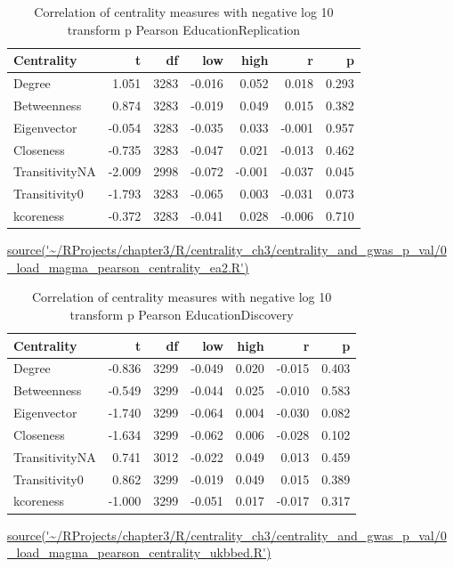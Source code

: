 \begin{table}[ht]
\centering
\begin{tabular}{lrrrrrr}
  \toprule
Centrality & t & df & low & high & r & p \\ 
  \midrule
Degree & 1.051 & 3283 & -0.016 & 0.052 & 0.018 & 0.293 \\ 
  Betweenness & 0.874 & 3283 & -0.019 & 0.049 & 0.015 & 0.382 \\ 
  Eigenvector & -0.054 & 3283 & -0.035 & 0.033 & -0.001 & 0.957 \\ 
  Closeness & -0.735 & 3283 & -0.047 & 0.021 & -0.013 & 0.462 \\ 
  TransitivityNA & -2.009 & 2998 & -0.072 & -0.001 & -0.037 & 0.045 \\ 
  Transitivity0 & -1.793 & 3283 & -0.065 & 0.003 & -0.031 & 0.073 \\ 
  kcoreness & -0.372 & 3283 & -0.041 & 0.028 & -0.006 & 0.710 \\ 
   \bottomrule
\end{tabular}
\caption{Correlation of centrality measures with negative log 10 transform p Pearson EducationReplication} 
\tiny\url{source('~/RProjects/chapter3/R/centrality_ch3/centrality_and_gwas_p_val/0_load_magma_pearson_centrality_ea2.R')}
\label{tab:Correlation of centrality measures with negative log 10 transform p Pearson EducationReplication}
\end{table}



\begin{table}[ht]
\centering
\begin{tabular}{lrrrrrr}
  \toprule
Centrality & t & df & low & high & r & p \\ 
  \midrule
Degree & -0.836 & 3299 & -0.049 & 0.020 & -0.015 & 0.403 \\ 
  Betweenness & -0.549 & 3299 & -0.044 & 0.025 & -0.010 & 0.583 \\ 
  Eigenvector & -1.740 & 3299 & -0.064 & 0.004 & -0.030 & 0.082 \\ 
  Closeness & -1.634 & 3299 & -0.062 & 0.006 & -0.028 & 0.102 \\ 
  TransitivityNA & 0.741 & 3012 & -0.022 & 0.049 & 0.013 & 0.459 \\ 
  Transitivity0 & 0.862 & 3299 & -0.019 & 0.049 & 0.015 & 0.389 \\ 
  kcoreness & -1.000 & 3299 & -0.051 & 0.017 & -0.017 & 0.317 \\ 
   \bottomrule
\end{tabular}
\caption{Correlation of centrality measures with negative log 10 transform p Pearson EducationDiscovery} 
\tiny\url{source('~/RProjects/chapter3/R/centrality_ch3/centrality_and_gwas_p_val/0_load_magma_pearson_centrality_ukbbed.R')}
\label{tab:Correlation of centrality measures with negative log 10 transform p Pearson EducationDiscovery}
\end{table}



